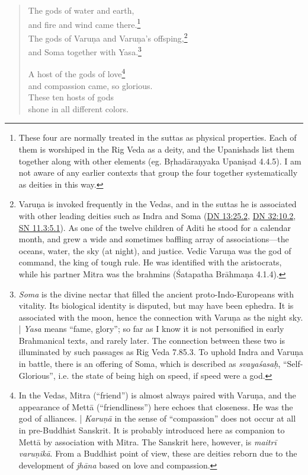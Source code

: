 \documentclass[12pt,openany]{book}%
\begin{document}
\begin{verse}
The gods of water and earth, \\
and fire and wind came there.\footnote{These four are normally treated in the suttas as physical properties. Each of them is worshiped in the Rig Veda as a deity, and the Upanishads list them together along with other elements (eg. \textsanskrit{Bṛhadāraṇyaka} \textsanskrit{Upaniṣad} 4.4.5). I am not aware of any earlier contexts that group the four together systematically as deities in this way. } \\
The gods of \textsanskrit{Varuṇa} and \textsanskrit{Varuṇa}’s offsping,\footnote{\textsanskrit{Varuṇa} is invoked frequently in the Vedas, and in the suttas he is associated with other leading deities such as Indra and Soma (\href{https://suttacentral.net/dn13/en/sujato\#25.2}{DN 13:25.2}, \href{https://suttacentral.net/dn32/en/sujato\#10.2}{DN 32:10.2}, \href{https://suttacentral.net/sn11.3/en/sujato\#5.1}{SN 11.3:5.1}). As one of the twelve children of Aditi he stood for a calendar month, and grew a wide and sometimes baffling array of associations—the oceans, water, the sky (at night), and justice. Vedic \textsanskrit{Varuṇa} was the god of command, the king of tough rule. He was identified with the aristocrats, while his partner Mitra was the brahmins (Śatapatha \textsanskrit{Brāhmaṇa} 4.1.4). } \\
and Soma together with Yasa.\footnote{\textit{Soma} is the divine nectar that filled the ancient proto-Indo-Europeans with vitality. Its biological identity is disputed, but may have been ephedra. It is associated with the moon, hence the connection with \textsanskrit{Varuṇa} as the night sky. | \textit{Yasa} means “fame, glory”; so far as I know it is not personified in early Brahmanical texts, and rarely later. The connection between these two is illuminated by such passages as Rig Veda 7.85.3. To uphold Indra and \textsanskrit{Varuṇa} in battle, there is an offering of Soma, which is described as \textit{\textsanskrit{svayaśasaḥ}}, “Self-Glorious”, i.e. the state of being high on speed, if speed were a god. } 

A host of the gods of love\footnote{In the Vedas, Mitra (“friend”) is almost always paired with \textsanskrit{Varuṇa}, and the appearance of \textsanskrit{Mettā} (“friendliness”) here echoes that closeness. He was the god of alliances. | \textit{\textsanskrit{Karuṇā}} in the sense of “compassion” does not occur at all in pre-Buddhist Sanskrit. It is probably introduced here as companion to \textsanskrit{Mettā} by association with Mitra. The Sanskrit here, however, is \textit{\textsanskrit{maitrī} \textsanskrit{varuṇikā}}. From a Buddhist point of view, these are deities reborn due to the development of \textit{\textsanskrit{jhāna}} based on love and compassion. } \\
and compassion came, so glorious. \\
These ten hosts of gods \\
shone in all different colors. 


\end{verse}
\end{document}
